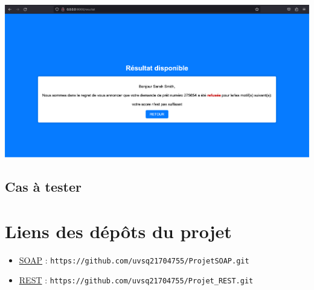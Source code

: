 \documentclass{article}
\begin{document}
\begin{itemize}
	   \\
	   \includegraphics[width=\textwidth]{images/confirmationr.png}
   
	\end{itemize}
	\subsection{Cas à tester}
	\newpage
	\section{Liens des dépôts du projet}
	 \begin{itemize}
	 	\item \textcolor{blue}{\href{https://github.com/uvsq21704755/ProjetSOAP.git}{SOAP}} : \texttt{https://github.com/uvsq21704755/ProjetSOAP.git}
	 	\item \textcolor{blue}{\href{https://github.com/uvsq21704755/ProjetREST.git}{REST}} : \texttt{https://github.com/uvsq21704755/Projet\_REST.git}
	 \end{itemize}
	

	
\end{document}
